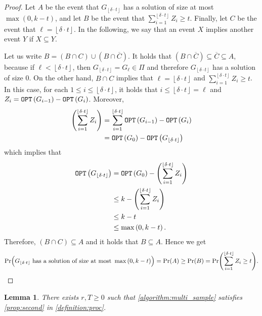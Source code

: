 \documentclass[letterpaper,11pt]{article}
\newcommand{\floor}[1]{ {\left\lfloor #1 \right\rfloor}}
\newcommand{\1}[1]{\mathds{1}\left[#1\right]}
\newcommand{\OPT}{\textnormal{\texttt{OPT}}}
\newtheorem{lemma}[theorem]{Lemma}
\begin{document}
\begin{proof}
Let $A$ be the event that $G_{\floor{\delta \cdot t}}$ has a solution
of size at most $\max\left( 0, k - t
\right) $, and let $B$ be the event that $\sum_{i
=1}^{\floor{\delta \cdot t}} Z_i \geq t$. Finally, let
$C$ be the event that $\ell = \floor{\delta \cdot t}$.
In the following, we say that an event $X$
implies another event $Y$ if $X \subseteq Y$.

Let us write $B = \left( B \cap C \right) \cup \left( B \cap \overline{C} \right) $. 
It holds that $(B \cap \overline{C}) \subseteq \overline{C}\subseteq A$, because if
$\ell < \floor{\delta \cdot t}$, then $G_{\floor{\delta \cdot t}} = G_{\ell}  \in \Pi$ and therefore
$G_{\floor{\delta \cdot t}}$ has a solution of size 0. On the other hand,
$B \cap C$ implies that $\ell = \floor{\delta \cdot t}$ and
$\sum_{i =1}^{\floor{\delta \cdot t}} Z_i \geq t$.
In this case, for each $1 \leq i \leq \floor{\delta \cdot t}$,
it holds that $i \leq \floor{\delta \cdot t} = \ell$ and
$Z_i = \OPT\left( G_{i - 1} \right) - \OPT\left( G_i \right)$.
Moreover,
	\begin{align*}
		\Biggl(\sum_{i =1}^{\floor{\delta \cdot t}} Z_i\Biggr) &= \sum_{i =1}^{\floor{\delta \cdot t}} \OPT\left( G_{i - 1} \right) - \OPT\left( G_i \right)\\
								       &= \OPT\left( G_0 \right) - \OPT\left( G_{\floor{\delta \cdot t}} \right) 
	\end{align*}
	which implies that
	\begin{align*}
		\OPT\left( G_{\floor{\delta \cdot t}} \right) &= \OPT\left( G_0 \right) - \Biggl(\sum_{i =1}^{\floor{\delta \cdot t}} Z_i\Biggr)\\
							      &\leq k - \Biggl(\sum_{i =1}^{\floor{\delta \cdot t}} Z_i\Biggr)\\
							      &\leq k - t\\
							      &\leq \max\left( 0, k - t \right) .
	\end{align*}
	Therefore, $(B \cap C) \subseteq A$ and it holds that $B \subseteq A$. Hence we get
	\begin{equation*}
		\Pr\Bigl( G_{\floor{\delta \cdot t}} \text{ has a solution of size at most } \max\left( 0, k - t \right)  \Bigr) = \Pr(A) \geq  \Pr(B) = \Pr\Biggl(\sum_{i =1}^{\floor{\delta \cdot t}} Z_i \geq t\Biggr).
	\end{equation*}
\end{proof}



\begin{lemma}\label{lemma:multi_step_proc_prop_2}
	There exists $r,T \geq 0$ such that \cref{algorithm:multi_sample} satisfies \cref{prop:second} in \cref{definition:proc}.
\end{lemma}
\end{document}
